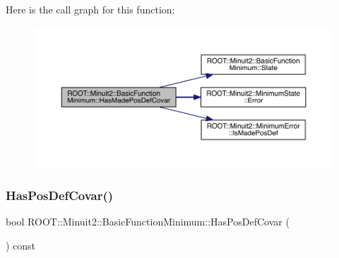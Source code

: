 Here is the call graph for this function\+:
\nopagebreak
\begin{figure}[H]
\begin{center}
\leavevmode
\includegraphics[width=350pt]{de/d25/classROOT_1_1Minuit2_1_1BasicFunctionMinimum_a57562fcd9f78a8e4f9a425c8f80f1d83_cgraph}
\end{center}
\end{figure}
\mbox{\label{classROOT_1_1Minuit2_1_1BasicFunctionMinimum_a82e819b720ca93301fdea10fc10af791}} 
\subsubsection{\texorpdfstring{HasPosDefCovar()}{HasPosDefCovar()}\hspace{0.1cm}{\footnotesize\ttfamily [1/2]}}
{\footnotesize\ttfamily bool R\+O\+O\+T\+::\+Minuit2\+::\+Basic\+Function\+Minimum\+::\+Has\+Pos\+Def\+Covar (\begin{DoxyParamCaption}{ }\end{DoxyParamCaption}) const\hspace{0.3cm}{\ttfamily [inline]}}


